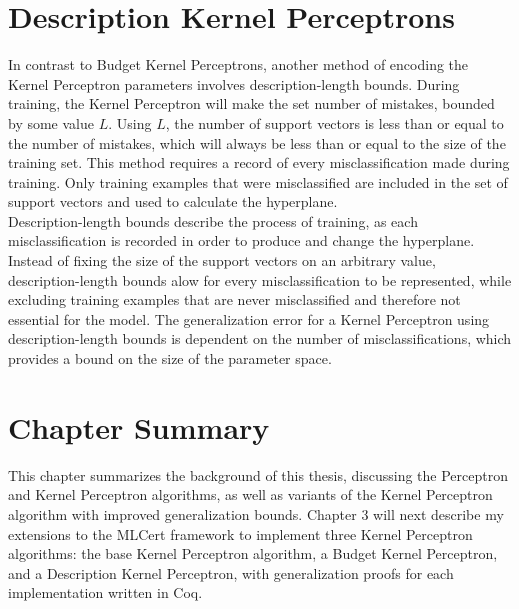 \section{Description Kernel Perceptrons}\label{DescriptionKernelPerceptronSection}
In contrast to Budget Kernel Perceptrons, another method of encoding the Kernel Perceptron parameters involves description-length bounds. During training, the Kernel Perceptron will make the set number of mistakes, bounded by some value $L$. Using $L$, the number of support vectors is less than or equal to the number of mistakes, which will always be less than or equal to the size of the training set. This method requires a record of every misclassification made during training. Only training examples that were misclassified are included in the set of support vectors and used to calculate the hyperplane.
\\Description-length bounds describe the process of training, as each misclassification is recorded in order to produce and change the hyperplane. Instead of fixing the size of the support vectors on an arbitrary value, description-length bounds alow for every misclassification to be represented, while excluding training examples that are never misclassified and therefore not essential for the model. The generalization error for a Kernel Perceptron using description-length bounds is dependent on the number of misclassifications, which provides a bound on the size of the parameter space.
\section{Chapter Summary}\label{BackgroundChapterSummarySection}
This chapter summarizes the background of this thesis, discussing the Perceptron and Kernel Perceptron algorithms, as well as variants of the Kernel Perceptron algorithm with improved generalization bounds. Chapter 3 will next describe my extensions to the MLCert framework to implement three Kernel Perceptron algorithms: the base Kernel Perceptron algorithm, a Budget Kernel Perceptron, and a Description Kernel Perceptron, with generalization proofs for each implementation written in Coq.
